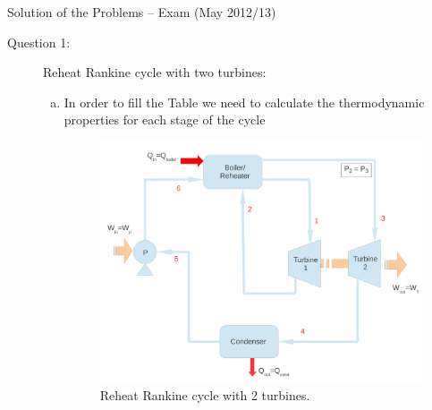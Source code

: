 \documentclass[12pt,twoside]{report}
\begin{document}
\setcounter{page}{1}

\vfill

\pagebreak


\begin{center}
{\Large Solution of the Problems -- Exam (May 2012/13)}
\end{center}

\begin{description}

\item [Question 1:] Reheat Rankine cycle with two turbines:
\begin{enumerate}[(a)]

\item \label{Q1}In order to fill the Table we need to calculate the thermodynamic properties for each stage of the cycle 

\begin{figure}[h]
\begin{center}
\includegraphics[width=10.cm,clip]{./Pics/Exam_Reheat_Rankine_Cycle}
\caption{ Reheat Rankine cycle with 2 turbines.}
\label{exam_mod01_rankinecycle}
\end{center}
\end{figure}

\begin{description}


\end{description}
\end{enumerate}
\end{description}
\end{document}
